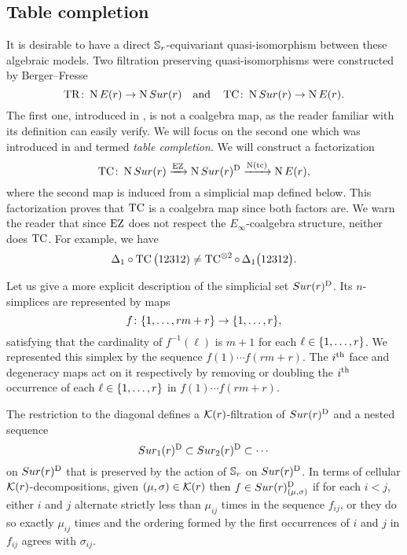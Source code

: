 
\subsection{Table completion}\label{ss:table completion}

It is desirable to have a direct $\mathbb{S}_r$-equivariant quasi-isomorphism between these algebraic models.
Two filtration preserving quasi-isomorphisms were constructed by Berger--Fresse
\[
\operatorname{TR} \colon \operatorname{N}E(r) \to \operatorname{N}Sur(r)
\quad \text{and} \quad
\operatorname{TC} \colon \operatorname{N}Sur(r) \to \operatorname{N} E(r).
\]
The first one, introduced in \cite[1$\cdot$3]{berger2004combinatorial}, is not a coalgebra map, as the reader familiar with its definition can easily verify.
We will focus on the second one which was introduced in \cite{berger2002prismatic} and termed \textit{table completion}.
We will construct a factorization
\[
\operatorname{TC} \colon \operatorname{N}Sur(r) \xrightarrow{\operatorname{EZ}} \operatorname{N}Sur(r)^{\mathrm{D}} \xrightarrow{\operatorname{N}(\operatorname{tc})} \operatorname{N} E(r),
\]
where the second map is induced from a simplicial map defined below.
This factorization proves that $\operatorname{TC}$ is a coalgebra map since both factors are.
We warn the reader that since $\operatorname{EZ}$ does not respect the $E_\infty$-coalgebra structure,
neither does $\operatorname{TC}$.
For example, we have
\[
\Delta_1 \circ \operatorname{TC}\big(12312) \neq \operatorname{TC}^{\otimes 2} \circ \, \Delta_1 \big(12312\big).
\]

Let us give a more explicit description of the simplicial set $Sur(r)^{\mathrm{D}}$.
Its $n$-simplices are represented by maps
\[
f \colon \{1,\dots,rm+r\} \to \{1,\dots,r\},
\]
satisfying that the cardinality of $f^{-1}(\ell)$ is $m+1$ for each $\ell \in \{1,\dots,r\}$.
We represented this simplex by the sequence $f(1) \dotsb f(rm+r)$.
The $i^{\mathrm{th}}$ face and degeneracy maps act on it respectively by removing or doubling the $i^{\mathrm{th}}$ occurrence of each $\ell \in \{1,\dots,r\}$ in $f(1) \dotsb f(rm+r)$.

The restriction to the diagonal defines a $\mathcal{K}(r)$-filtration of $Sur(r)^{\mathrm{D}}$ and a nested sequence
\[
Sur_1(r)^{\mathrm{D}} \subset Sur_2(r)^{\mathrm{D}} \subset \dotsb
\]
on $Sur(r)^{\mathrm{D}}$ that is preserved by the action of $\mathbb{S}_r$ on $Sur(r)^{\mathrm{D}}$.
In terms of cellular $\mathcal{K}(r)$-decompositions, given $(\mu,\sigma) \in \mathcal{K}(r)$ then $f \in Sur(r)^{\mathrm{D}}_{(\mu,\sigma)}$ if for each $i<j$, either $i$ and $j$ alternate strictly less than $\mu_{ij}$ times in the sequence $f_{ij}$, or they do so exactly $\mu_{ij}$ times and the ordering formed by the first occurrences of $i$ and $j$ in $f_{ij}$ agrees with $\sigma_{ij}$.

